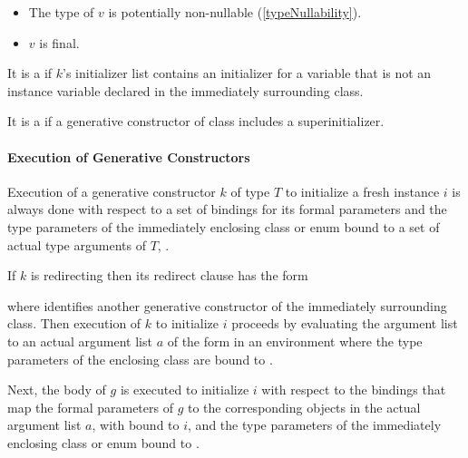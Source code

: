 \documentclass[makeidx]{article}
\begin{document}
\begin{itemize}
\item The type of $v$ is potentially non-nullable
  (\ref{typeNullability}).
\item $v$ is final.
\end{itemize}

\LMHash{}%
It is a  if $k$'s initializer list contains
an initializer for a variable that is not
an instance variable declared in the immediately surrounding class.


\LMHash{}%
It is a  if a generative constructor of class 
includes a superinitializer.


\paragraph{Execution of Generative Constructors}

\LMHash{}%
%
Execution of a generative constructor $k$ of type $T$
to initialize a fresh instance $i$
is always done with respect to a set of bindings for its formal parameters
and the type parameters of the immediately enclosing class or enum bound to
a set of actual type arguments of $T$, .


\LMHash{}%
If $k$ is redirecting then its redirect clause has the form

\noindent
{}

where  identifies another generative constructor
of the immediately surrounding class.
Then execution of $k$ to initialize $i$ proceeds by
evaluating the argument list
\code{(\ArgumentListStd)}
to an actual argument list $a$ of the form
in an environment where the
type parameters of the enclosing class are bound to
.

\LMHash{}%
Next, the body of $g$ is executed to initialize $i$
with respect to the bindings that map
the formal parameters of $g$ to the corresponding objects
in the actual argument list $a$,
with \THIS{} bound to $i$,
and the type parameters of the immediately enclosing class or enum bound to
.
\end{document}
